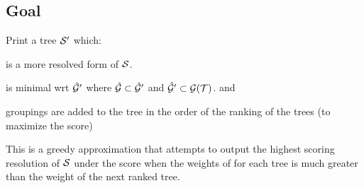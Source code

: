 \documentclass[11pt]{article}
\begin{document}
\subsection*{Goal}
Print a tree $\mathcal{S}^{\prime}$ which:
\begin{compactitem}
    \item is a more resolved form of $\mathcal{S}$.
    \item is minimal wrt $\hat{\mathcal{G}}^{\prime}$ where $\hat{\mathcal{G}} \subset \hat{\mathcal{G}}^{\prime}$ and $\hat{\mathcal{G}}^{\prime} \subset \mathcal{G}(\mathcal{T})$. and 
    \item groupings are added to the tree in the order of the ranking of the trees (to maximize the \SWIPSD score)
\end{compactitem}

This is a greedy approximation that attempts to output the highest scoring resolution of $\mathcal{S}$ under the \SWIPSD score when the
    weights of for each tree is much greater than the weight of the next ranked tree.
\end{document}
